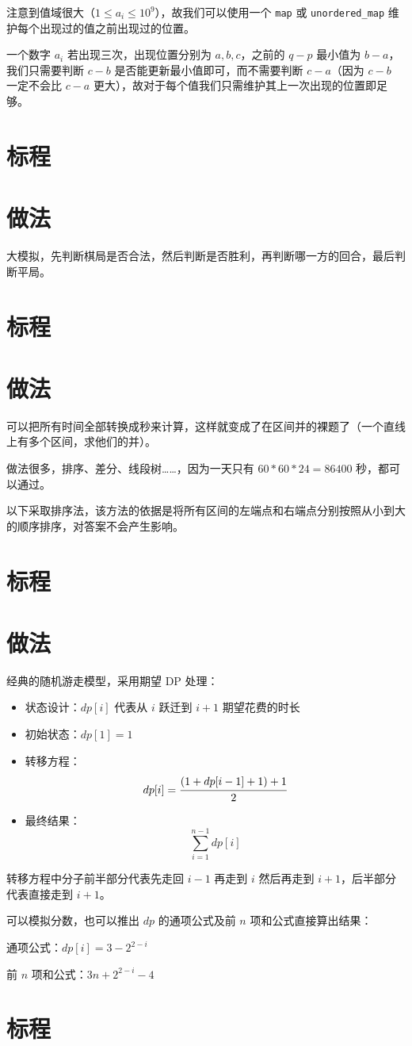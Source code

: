 \documentclass{../cpct/ctsol}
\begin{document}
注意到值域很大（$1 \leq a_i \leq {10}^9$），故我们可以使用一个 \lstinline{map} 或 \lstinline{unordered_map} 维护每个出现过的值之前出现过的位置。

一个数字 $a_i$ 若出现三次，出现位置分别为 $a,b,c$，之前的 $q-p$ 最小值为 $b-a$，我们只需要判断 $c-b$ 是否能更新最小值即可，而不需要判断 $c-a$（因为 $c-b$ 一定不会比 $c-a$ 更大），故对于每个值我们只需维护其上一次出现的位置即足够。

\section*{标程}


\makesolution
\section*{做法}

大模拟，先判断棋局是否合法，然后判断是否胜利，再判断哪一方的回合，最后判断平局。

\section*{标程}


\makesolution
\section*{做法}

可以把所有时间全部转换成秒来计算，这样就变成了在区间并的裸题了（一个直线上有多个区间，求他们的并）。

做法很多，排序、差分、线段树……，因为一天只有 $60*60*24=86400$ 秒，都可以通过。

以下采取排序法，该方法的依据是将所有区间的左端点和右端点分别按照从小到大的顺序排序，对答案不会产生影响。

\section*{标程}


\makesolution
\section*{做法}

经典的随机游走模型，采用期望 DP 处理：

\begin{itemize}
    \item 状态设计：$dp[i]$ 代表从 $i$ 跃迁到 $i+1$ 期望花费的时长
    \item 初始状态：$dp[1] = 1$
    \item 转移方程：$$dp[i] = \cfrac{(1+dp[i-1]+1)+1}{2}$$
    \item 最终结果：$$\sum\limits_{i=1}^{n-1} dp[i]$$
\end{itemize}

转移方程中分子前半部分代表先走回 $i-1$ 再走到 $i$ 然后再走到 $i+1$，后半部分代表直接走到 $i+1$。

可以模拟分数，也可以推出 $dp$ 的通项公式及前 $n$ 项和公式直接算出结果：

通项公式：$dp[i] = 3-2^{2-i}$

前 $n$ 项和公式：$3n+2^{2-i}-4$

\section*{标程}

\end{document}
